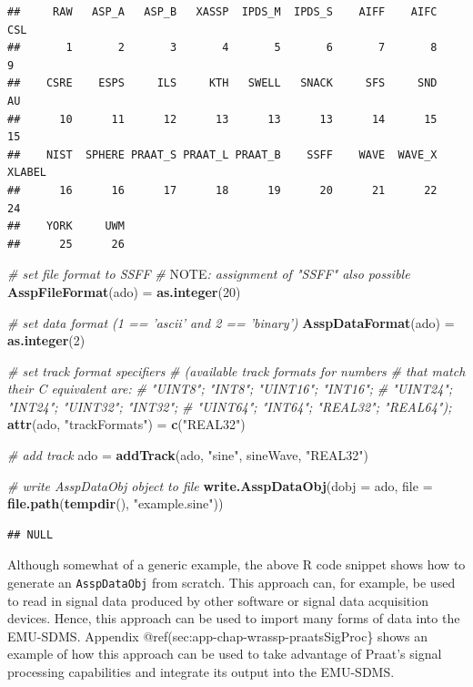 \documentclass[]{book}
\newenvironment{Shaded}{\begin{snugshade}}{\end{snugshade}}
\newcommand{\AlertTok}[1]{\textcolor[rgb]{0.94,0.16,0.16}{#1}}
\newcommand{\CommentTok}[1]{\textcolor[rgb]{0.56,0.35,0.01}{\textit{#1}}}
\newcommand{\DataTypeTok}[1]{\textcolor[rgb]{0.13,0.29,0.53}{#1}}
\newcommand{\DecValTok}[1]{\textcolor[rgb]{0.00,0.00,0.81}{#1}}
\newcommand{\KeywordTok}[1]{\textcolor[rgb]{0.13,0.29,0.53}{\textbf{#1}}}
\newcommand{\NormalTok}[1]{#1}
\newcommand{\StringTok}[1]{\textcolor[rgb]{0.31,0.60,0.02}{#1}}
\begin{document}
\begin{verbatim}
##     RAW   ASP_A   ASP_B   XASSP  IPDS_M  IPDS_S    AIFF    AIFC     CSL 
##       1       2       3       4       5       6       7       8       9 
##    CSRE    ESPS     ILS     KTH   SWELL   SNACK     SFS     SND      AU 
##      10      11      12      13      13      13      14      15      15 
##    NIST  SPHERE PRAAT_S PRAAT_L PRAAT_B    SSFF    WAVE  WAVE_X  XLABEL 
##      16      16      17      18      19      20      21      22      24 
##    YORK     UWM 
##      25      26
\end{verbatim}

\begin{Shaded}
\begin{Highlighting}[]
\CommentTok{# set file format to SSFF}
\CommentTok{# }\AlertTok{NOTE}\CommentTok{: assignment of "SSFF" also possible}
\KeywordTok{AsspFileFormat}\NormalTok{(ado) =}\StringTok{ }\KeywordTok{as.integer}\NormalTok{(}\DecValTok{20}\NormalTok{)}

\CommentTok{# set data format (1 == 'ascii' and 2 == 'binary')}
\KeywordTok{AsspDataFormat}\NormalTok{(ado) =}\StringTok{ }\KeywordTok{as.integer}\NormalTok{(}\DecValTok{2}\NormalTok{)}

\CommentTok{# set track format specifiers}
\CommentTok{# (available track formats for numbers}
\CommentTok{# that match their C equivalent are:}
\CommentTok{# "UINT8"; "INT8"; "UINT16"; "INT16";}
\CommentTok{# "UINT24"; "INT24"; "UINT32"; "INT32";}
\CommentTok{# "UINT64"; "INT64"; "REAL32"; "REAL64");}
\KeywordTok{attr}\NormalTok{(ado, }\StringTok{"trackFormats"}\NormalTok{) =}\StringTok{ }\KeywordTok{c}\NormalTok{(}\StringTok{"REAL32"}\NormalTok{)}

\CommentTok{# add track}
\NormalTok{ado =}\StringTok{ }\KeywordTok{addTrack}\NormalTok{(ado, }\StringTok{"sine"}\NormalTok{, sineWave, }\StringTok{"REAL32"}\NormalTok{)}

\CommentTok{# write AsspDataObj object to file}
\KeywordTok{write.AsspDataObj}\NormalTok{(}\DataTypeTok{dobj =}\NormalTok{ ado,}
                  \DataTypeTok{file =} \KeywordTok{file.path}\NormalTok{(}\KeywordTok{tempdir}\NormalTok{(), }\StringTok{"example.sine"}\NormalTok{))}
\end{Highlighting}
\end{Shaded}

\begin{verbatim}
## NULL
\end{verbatim}

Although somewhat of a generic example, the above R code snippet shows how to generate an \texttt{AsspDataObj} from scratch. This approach can, for example, be used to read in signal data produced by other software or signal data acquisition devices. Hence, this approach can be used to import many forms of data into the EMU-SDMS. Appendix @ref(sec:app-chap-wrassp-praatsSigProc\} shows an example of how this approach can be used to take advantage of Praat's signal processing capabilities and integrate its output into the EMU-SDMS.
\end{document}
